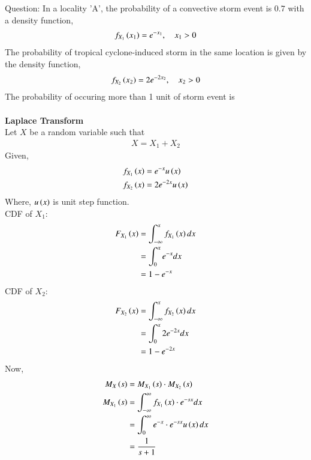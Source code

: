 \documentclass[journal,12pt,twocolumn]{IEEEtran}
\theoremstyle{remark}
\begin{document}
%
Question:
In a locality 'A', the probability of a convective storm event is $0.7$ with a density function,
\begin{align}
f_{X_1}\left(x_1\right) = e^{-x_1},\quad x_1>0
\end{align} 
The probability of tropical cyclone-induced storm in the same location is given by the density function,
\begin{align}
f_{X_2}\left(x_2\right) = 2e^{-2x_2},\quad x_2>0
\end{align}
The probability of occuring more than 1 unit of storm event is\\
\fi
\solution\\
\textbf{Laplace Transform}\\
Let $X$ be a random variable such that 
\begin{align}
X = X_1 + X_2
\end{align}
Given,
\begin{align}
f_{X_1}\left(x\right) &= e^{-x}u\left(x\right)\\
f_{X_2}\left(x\right) &= 2e^{-2x}u\left(x\right)
\end{align}
Where, $u\left(x\right)$ is unit step function.\\
CDF of $X_1$:
\begin{align}
F_{X_1}\left(x\right) &= \int_{-\infty}^{x} f_{X_1}\left(x\right)dx\\
&= \int_{0}^{x} e^{-x}dx\\
&= 1- e^{-x}
\end{align}
CDF of $X_2$:
\begin{align}
F_{X_2}\left(x\right) &= \int_{-\infty}^{x} f_{X_2}\left(x\right)dx\\
&= \int_{0}^{x} 2e^{-2x}dx\\
&= 1- e^{-2x}
\end{align}
Now,
\begin{align}
M_X\left(s\right) &= M_{X_1}\left(s\right) \cdot M_{X_2}\left(s\right)\label{eq:2023/AG/49/1}\\
M_{X_1}\left(s\right) &= \int_{-\infty}^{\infty} f_{X_1}\left(x\right)\cdot e^{-sx}dx\\
&= \int_{0}^{\infty} e^{-x}\cdot e^{-sx}u\left(x\right)dx\\
&= \frac{1}{s+1}\label{eq:2023/AG/49/2}
\end{align}
\end{document}
